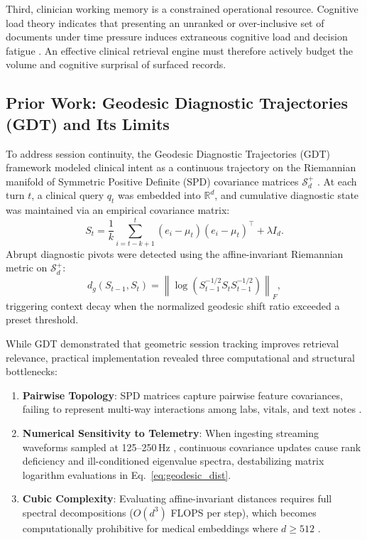 \documentclass[12pt]{article}
\newcommand{\R}{\mathbb{R}}
\newcommand{\norm}[1]{\left\lVert#1\right\rVert}
\begin{document}
Third, clinician working memory is a constrained operational resource. Cognitive load theory indicates that presenting an unranked or over-inclusive set of documents under time pressure induces extraneous cognitive load and decision fatigue \cite{sweller1988cognitive,miller1956magical}. An effective clinical retrieval engine must therefore actively budget the volume and cognitive surprisal of surfaced records.

\subsection*{Prior Work: Geodesic Diagnostic Trajectories (GDT) and Its Limits}

To address session continuity, the Geodesic Diagnostic Trajectories (GDT) framework modeled clinical intent as a continuous trajectory on the Riemannian manifold of Symmetric Positive Definite (SPD) covariance matrices $\mathcal{S}_d^+$ \cite{arsigny2007geometric,pennec2006riemannian,moakher2005differential}. At each turn $t$, a clinical query $q_t$ was embedded into $\R^d$, and cumulative diagnostic state was maintained via an empirical covariance matrix:
\begin{equation}
  S_t = \frac{1}{k}\sum_{i=t-k+1}^{t}(e_i - \mu_t)(e_i - \mu_t)^\top + \lambda I_d.
  \label{eq:spd_matrix}
\end{equation}
Abrupt diagnostic pivots were detected using the affine-invariant Riemannian metric on $\mathcal{S}_d^+$:
\begin{equation}
  d_g(S_{t-1},S_t)=\norm{\log\!\left(S_{t-1}^{-1/2} S_t S_{t-1}^{-1/2}\right)}_F,
  \label{eq:geodesic_dist}
\end{equation}
triggering context decay when the normalized geodesic shift ratio exceeded a preset threshold.

While GDT demonstrated that geometric session tracking improves retrieval relevance, practical implementation revealed three computational and structural bottlenecks:
\begin{enumerate}[(1)]
  \item \textbf{Pairwise Topology}: SPD matrices capture pairwise feature covariances, failing to represent multi-way interactions among labs, vitals, and text notes \cite{feng2019hypergraph,gao2022hgnnplus}.
  \item \textbf{Numerical Sensitivity to Telemetry}: When ingesting streaming waveforms sampled at 125--250\,Hz \cite{gu2023mamba,hyland2020hirid}, continuous covariance updates cause rank deficiency and ill-conditioned eigenvalue spectra, destabilizing matrix logarithm evaluations in Eq.~\eqref{eq:geodesic_dist}.
  \item \textbf{Cubic Complexity}: Evaluating affine-invariant distances requires full spectral decompositions ($O(d^3)$ FLOPS per step), which becomes computationally prohibitive for medical embeddings where $d \ge 512$ \cite{huang2017riemannian}.
\end{enumerate}
\end{document}

